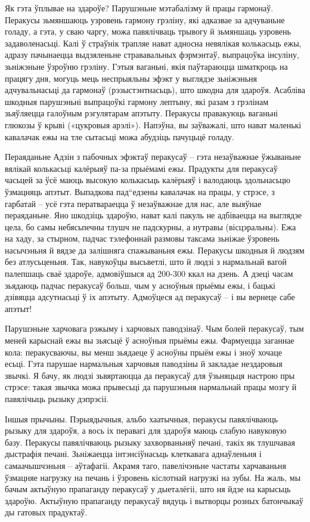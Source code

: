 Як гэта ўплывае на здароўе?
Парушэньне мэтабалізму й працы гармонаў.
Перакусы зьмяншаюць узровень гармону грэліну, які адказвае за адчуваньне голаду, а гэта, у сваю чаргу, можа павялічваць трывогу й зьмяншаць узровень задаволенасьці. Калі ў страўнік трапляе нават адносна невялікая колькасьць ежы, адразу пачынаецца выдзяленьне стрававальных фэрмэнтаў, выпрацоўка інсуліну, зьніжэньне ўзроўню грэліну. Гэтыя ваганьні, якія паўтараюцца шматкроць на працягу дня, могуць мець неспрыяльны эфэкт у выглядзе зьніжэньня адчувальнасьці да гармонаў (рэзыстэнтнасьць), што шкодна для здароўя. Асабліва шкодныя парушэньні выпрацоўкі гармону лептыну, які разам з грэлінам зьяўляецца галоўным рэгулятарам апэтыту. Перакусы правакуюць ваганьні глюкозы ў крыві («цукровыя арэлі»). Напэўна, вы заўважалі, што нават маленькі кавалачак ежы на тле сытасьці можа абудзіць пачуцьцё голаду.

Пераяданьне
Адзін з пабочных эфэктаў перакусаў – гэта незаўважнае ўжываньне вялікай колькасьці калёрыяў па-за прыёмамі ежы. Прадукты для перакусаў часьцей за ўсё маюць высокую колькасьць калёрыяў і валодаюць здольнасьцю ўзмацняць апэтыт. Выпадкова пад“едзены кавалачак на працы, у стрэсе, з гарбатай – усё гэта ператвараецца ў незаўважнае для нас, але выяўнае пераяданьне. Яно шкодзіць здароўю, нават калі пакуль не адбіваецца на выглядзе цела, бо самы небясьпечны тлушч не падскурны, а нутравы (вісцэральны). Ежа на хаду, за стырном, падчас тэлефоннай размовы таксама зьніжае ўзровень насычэньня й вядзе да залішняга спажываньня ежы. Перакусы шкодныя й людзям без атлусьценьня. Так, навукоўцы высьветлі, што й людзі з нармальнай вагой палепшаць сваё здароўе, адмовіўшыся ад 200-300 ккал на дзень. А дзеці часам зьядаюць падчас перакусаў больш, чым у асноўныя прыёмы ежы, і бацькі дзівяцца адсутнасьці ў іх апэтыту. Адмоўцеся ад перакусаў – і вы вернеце сабе апэтыт!

Парушэньне харчовага рэжыму і харчовых паводзінаў.
Чым болей перакусаў, тым меней карыснай ежы вы зьясьцё ў асноўныя прыёмы ежы. Фармуецца заганнае кола: перакусваючы, вы менш зьядаеце ў асноўны прыём ежы і зноў хочаце есьці. Гэта парушае нармальныя харчовыя паводзіны й закладае нездаровыя звычкі. Я бачу, як людзі зьвяртаюцца да перакусаў для ўзьняцьця настрою пры стрэсе: такая звычка можа прывесьці да парушэньня нармальнай працы мозгу й павялічыць рызыку дэпрэсіі.

Іншыя прычыны.
Пэрыядычныя, альбо хаатычныя, перакусы павялічваюць рызыку для здароўя, а вось іх перавагі для здароўя маюць слабую навуковую базу. Перакусы павялічваюць рызыку захворваньняў печані, такіх як тлушчавая дыстрафія печані. Зьніжаецца інтэнсіўнасьць клеткавага аднаўленьня і самаачышчэньня – аўтафагіі. Акрамя таго, павелічэньне частаты харчаваньня ўзмацняе нагрузку на печань і ўзровень кіслотнай нагрузкі на зубы. На жаль, мы бачым актыўную прапаганду перакусаў у дыеталёгіі, што ня йдзе на карысьць здароўю. Актыўную прапаганду перакусаў вядуць і вытворцы розных батончыкаў ды гатовых прадуктаў.

